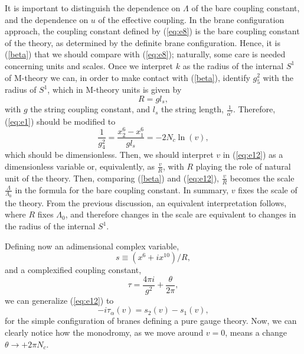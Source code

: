 It is important to distinguish the dependence on $\Lambda$ of the
bare coupling constant, and the dependence on $u$ of the
effective coupling. In the brane configuration approach, the
coupling constant defined by (\ref{eq:e8}) is the bare coupling
constant of the theory, as determined by the definite brane
configuration. Hence, it is (\ref{beta}) that we should compare
with (\ref{eq:e8}); naturally, some care is needed concerning
units and scales. Once we interpret $k$ as the radius of the
internal $S^1$ of M-theory we can, in order to make contact with
(\ref{beta}), identify $g_5^2$ with the radius of $S^1$, which in
M-theory units is given by
\begin{equation}
R = g l_s,
\end{equation}
with $g$ the string coupling constant, and $l_s$ the string
length, $\frac {1}{\alpha'}$. Therefore, (\ref{eq:e1}) should be modified
to
\begin{equation}
\frac {1}{g_4^2} = \frac {x^6_2-x^6_1}{gl_s} = - 2 N_c \ln (v),
\label{eq:e12}
\end{equation}
which should be dimensionless. Then, we should interpret $v$ in
(\ref{eq:e12}) as a dimensionless variable or, equivalently, as
$\frac {v}{R}$, with $R$ playing the role of natural unit of the
theory. Then, comparing (\ref{beta}) and (\ref{eq:e12}), $\frac
{v}{R}$ becomes the scale $\frac {\Lambda}{\Lambda_0}$ in the
formula for the bare coupling constant. In summary, $v$ fixes the
scale of the theory. From the previous discussion, an equivalent
interpretation follows, where $R$ fixes $\Lambda_0$, and
therefore changes in the scale are equivalent to changes in the
radius of the internal $S^1$.
  
Defining
now an adimensional complex variable,
\begin{equation}
s \equiv (x^6+ix^{10})/R,
\label{eq:e13}
\end{equation}
and a complexified coupling constant,
\begin{equation}
\tau = \frac {4 \pi i}{g^2} + \frac {\theta}{2 \pi},
\label{eq:e14}
\end{equation}
we can generalize (\ref{eq:e12}) to
\begin{equation}
-i \tau_{\alpha}(v) = s_{2}(v) -s_{1}(v),
\label{eq:e15}
\end{equation}
for the simple configuration of branes defining a pure gauge
theory. Now, we can clearly notice how the monodromy, as we move
around $v=0$, means a change $\theta \rightarrow + 2 \pi N_c$.
  

